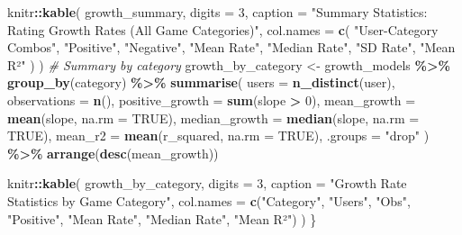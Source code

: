 \documentclass[
]{article}
\newenvironment{Shaded}{\begin{snugshade}}{\end{snugshade}}
\newcommand{\AttributeTok}[1]{\textcolor[rgb]{0.13,0.29,0.53}{#1}}
\newcommand{\CommentTok}[1]{\textcolor[rgb]{0.56,0.35,0.01}{\textit{#1}}}
\newcommand{\ConstantTok}[1]{\textcolor[rgb]{0.56,0.35,0.01}{#1}}
\newcommand{\DecValTok}[1]{\textcolor[rgb]{0.00,0.00,0.81}{#1}}
\newcommand{\FunctionTok}[1]{\textcolor[rgb]{0.13,0.29,0.53}{\textbf{#1}}}
\newcommand{\NormalTok}[1]{#1}
\newcommand{\OtherTok}[1]{\textcolor[rgb]{0.56,0.35,0.01}{#1}}
\newcommand{\SpecialCharTok}[1]{\textcolor[rgb]{0.81,0.36,0.00}{\textbf{#1}}}
\newcommand{\StringTok}[1]{\textcolor[rgb]{0.31,0.60,0.02}{#1}}
\begin{document}
\begin{Shaded}
\begin{Highlighting}[]
\NormalTok{    knitr}\SpecialCharTok{::}\FunctionTok{kable}\NormalTok{(}
\NormalTok{        growth\_summary,}
        \AttributeTok{digits =} \DecValTok{3}\NormalTok{,}
        \AttributeTok{caption =} \StringTok{"Summary Statistics: Rating Growth Rates (All Game Categories)"}\NormalTok{,}
        \AttributeTok{col.names =} \FunctionTok{c}\NormalTok{(}
            \StringTok{"User{-}Category Combos"}\NormalTok{, }\StringTok{"Positive"}\NormalTok{, }\StringTok{"Negative"}\NormalTok{, }\StringTok{"Mean Rate"}\NormalTok{, }\StringTok{"Median Rate"}\NormalTok{,}
            \StringTok{"SD Rate"}\NormalTok{, }\StringTok{"Mean R²"}
\NormalTok{        )}
\NormalTok{    )}
    \CommentTok{\# Summary by category}
\NormalTok{    growth\_by\_category }\OtherTok{\textless{}{-}}\NormalTok{ growth\_models }\SpecialCharTok{\%\textgreater{}\%}
        \FunctionTok{group\_by}\NormalTok{(category) }\SpecialCharTok{\%\textgreater{}\%}
        \FunctionTok{summarise}\NormalTok{(}
            \AttributeTok{users =} \FunctionTok{n\_distinct}\NormalTok{(user),}
            \AttributeTok{observations =} \FunctionTok{n}\NormalTok{(),}
            \AttributeTok{positive\_growth =} \FunctionTok{sum}\NormalTok{(slope }\SpecialCharTok{\textgreater{}} \DecValTok{0}\NormalTok{),}
            \AttributeTok{mean\_growth =} \FunctionTok{mean}\NormalTok{(slope, }\AttributeTok{na.rm =} \ConstantTok{TRUE}\NormalTok{),}
            \AttributeTok{median\_growth =} \FunctionTok{median}\NormalTok{(slope, }\AttributeTok{na.rm =} \ConstantTok{TRUE}\NormalTok{),}
            \AttributeTok{mean\_r2 =} \FunctionTok{mean}\NormalTok{(r\_squared, }\AttributeTok{na.rm =} \ConstantTok{TRUE}\NormalTok{),}
            \AttributeTok{.groups =} \StringTok{"drop"}
\NormalTok{        ) }\SpecialCharTok{\%\textgreater{}\%}
        \FunctionTok{arrange}\NormalTok{(}\FunctionTok{desc}\NormalTok{(mean\_growth))}

\NormalTok{    knitr}\SpecialCharTok{::}\FunctionTok{kable}\NormalTok{(}
\NormalTok{        growth\_by\_category,}
        \AttributeTok{digits =} \DecValTok{3}\NormalTok{,}
        \AttributeTok{caption =} \StringTok{"Growth Rate Statistics by Game Category"}\NormalTok{,}
        \AttributeTok{col.names =} \FunctionTok{c}\NormalTok{(}\StringTok{"Category"}\NormalTok{, }\StringTok{"Users"}\NormalTok{, }\StringTok{"Obs"}\NormalTok{, }\StringTok{"Positive"}\NormalTok{, }\StringTok{"Mean Rate"}\NormalTok{, }\StringTok{"Median Rate"}\NormalTok{, }\StringTok{"Mean R²"}\NormalTok{)}
\NormalTok{    )}
\NormalTok{\}}
\end{Highlighting}
\end{Shaded}
\end{document}
